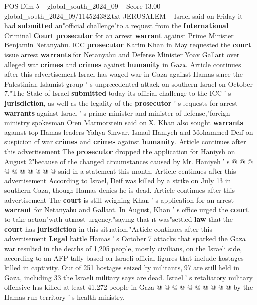 \begin{textsample}{POS Dim 5 – global\_south\_2024\_09 – Score 13.00 – global\_south\_2024\_09/114524382.txt}  \label{ex:f5_pos_238}
JERUSALEM -- Israel said on Friday it had \textbf{submitted} an"official challenge"to a request from the \textbf{International} Criminal \textbf{Court} \textbf{prosecutor} for an arrest \textbf{warrant} against Prime Minister Benjamin Netanyahu.
ICC \textbf{prosecutor} Karim Khan in May requested the \textbf{court} issue arrest \textbf{warrants} for Netanyahu and Defense Minister Yoav Gallant over alleged war \textbf{crimes} and \textbf{crimes} against \textbf{humanity} in Gaza.
Article continues after this advertisement Israel has waged war in Gaza against Hamas since the Palestinian Islamist group ' s unprecedented attack on southern Israel on October 7."The State of Israel \textbf{submitted} today its official challenge to the ICC ' s \textbf{jurisdiction}, as well as the legality of the \textbf{prosecutor} ' s requests for arrest \textbf{warrants} against Israel ' s prime minister and minister of defense,"foreign ministry spokesman Oren Marmorstein said on X.
Khan also sought \textbf{warrants} against top Hamas leaders Yahya Sinwar, Ismail Haniyeh and Mohammed Deif on suspicion of war \textbf{crimes} and \textbf{crimes} against \textbf{humanity}.
Article continues after this advertisement The \textbf{prosecutor} dropped the application for Haniyeh on August 2"because of the changed circumstances caused by Mr.
Haniyeh ' s @ @ @ @ @ @ @ @ @ @ said in a statement this month.
Article continues after this advertisement According to Israel, Deif was killed by a strike on July 13 in southern Gaza, though Hamas denies he is dead.
Article continues after this advertisement The \textbf{court} is still weighing Khan ' s application for an arrest \textbf{warrant} for Netanyahu and Gallant.
In August, Khan ' s office urged the \textbf{court} to take action"with utmost urgency,"saying that it was"settled \textbf{law} that the \textbf{court} has \textbf{jurisdiction} in this situation."Article continues after this advertisement \textbf{Legal} battle Hamas ' s October 7 attacks that sparked the Gaza war resulted in the deaths of 1,205 people, mostly civilians, on the Israeli side, according to an AFP tally based on Israeli official figures that include hostages killed in captivity.
Out of 251 hostages seized by militants, 97 are still held in Gaza, including 33 the Israeli military says are dead.
Israel ' s retaliatory military offensive has killed at least 41,272 people in Gaza @ @ @ @ @ @ @ @ @ @ by the Hamas-run territory ' s health ministry.

\end{textsample}
